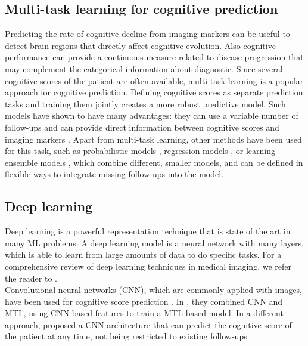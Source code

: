 \subsection{Multi-task learning for cognitive prediction}

Predicting the rate of cognitive decline from imaging markers can be useful to detect brain regions that directly affect cognitive evolution. Also cognitive performance can provide a continuous measure related to disease progression that may complement the categorical information about diagnostic. Since several cognitive scores of the patient are often available, multi-task learning is a popular approach for cognitive prediction. Defining cognitive scores as separate prediction tasks and training them jointly creates a more robust predictive model. Such models have shown to have many advantages: they can use a variable number of follow-ups \cite{Lei2017,Zhou2013a,Aksman2019} and can provide direct information between cognitive scores and imaging markers \cite{Jie2017,Lei2017,Wang2012b,Wang2016,Zhang2012a}. Apart from multi-task learning, other methods have been used for this task, such as probabilistic models \cite{Zhu2018}, regression models \cite{AraqueCaballero2017}, or learning ensemble models \cite{Chi2017,Huang2016c,Yang2018a}, which combine different, smaller models, and can be defined in flexible ways to integrate missing follow-ups into the model. \\

\subsection{Deep learning}

Deep learning is a powerful representation technique that is state of the art in many ML problems. A deep learning model is a neural network with many layers, which is able to learn from large amounts of data to do specific tasks. For a comprehensive review of deep learning techniques in medical imaging, we refer the reader to \cite{Litjens2017}. \\

Convolutional neural networks (CNN), which are commonly applied with images, have been used for cognitive score prediction \cite{Givon2017,Zhang2017}. In \cite{Zhang2017}, they combined CNN and MTL, using CNN-based features to train a MTL-based model. In a different approach, \cite{Givon2017} proposed a CNN architecture that can predict the cognitive score of the patient at any time, not being restricted to existing follow-ups. \\

